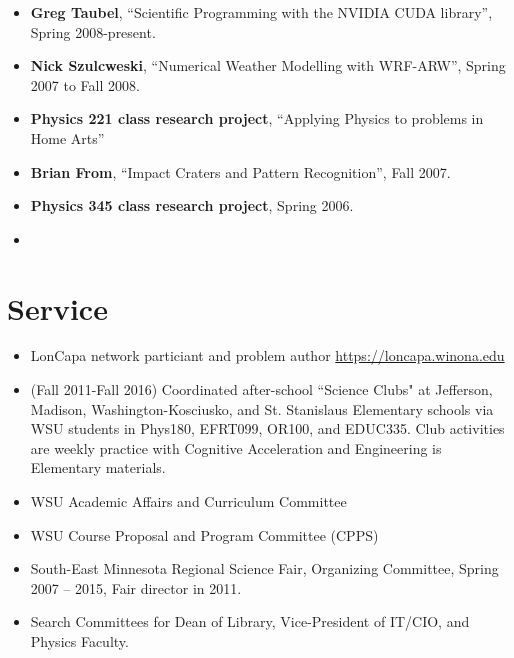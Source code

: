 \documentclass[margin,line,letterpaper]{res}
\begin{document}
\begin{resume}
\begin{itemize}
\item \textbf{Greg Taubel}, ``Scientific Programming with the NVIDIA CUDA library'', Spring 2008-present.
\item \textbf{Nick Szulcweski}, 
``Numerical Weather Modelling with WRF-ARW'', Spring 2007 to Fall 2008.
\item \textbf{Physics 221 class research project}, ``Applying Physics to problems in Home Arts''
\item \textbf{Brian From}, 
``Impact Craters and Pattern Recognition'', Fall 2007.
\item \textbf{Physics 345 class research project}, Spring 2006.
\item 

\end{itemize}


\section{\bf Service}
\begin{itemize}
\item LonCapa network particiant and problem author \url{https://loncapa.winona.edu}
\item (Fall 2011-Fall 2016) Coordinated after-school ``Science Clubs" at Jefferson, Madison, Washington-Kosciusko,  and St. Stanislaus Elementary schools via WSU students in Phys180, EFRT099, OR100, and EDUC335.  Club activities are weekly practice with Cognitive Acceleration and Engineering is Elementary materials.
\item WSU Academic Affairs and Curriculum Committee%
\item WSU Course Proposal and Program Committee (CPPS)%
\item South-East Minnesota Regional Science Fair, Organizing Committee, Spring 2007 -- 2015, Fair director in 2011.
\item Search Committees for Dean of Library, Vice-President of IT/CIO, and Physics Faculty.
\end{itemize}




\end{resume}
\end{document}
